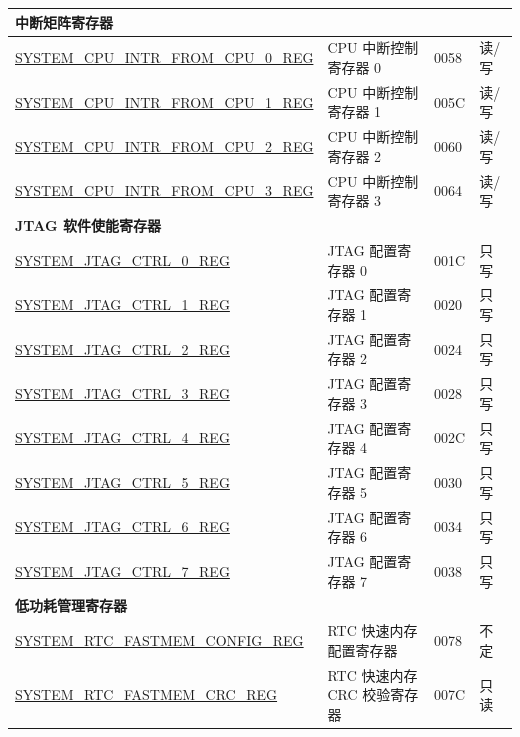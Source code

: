 \begin{longtable}{ | p{7cm} | p{6.5cm} | p{1.3cm} | p{1.5cm} | }
\multicolumn{4}{|l|}{\textbf{中断矩阵寄存器}} \\ \hline

\hyperref[regdesc:SYSTEMCPUINTRFROMCPU0REG]{SYSTEM\_CPU\_INTR\_FROM\_CPU\_0\_REG} & CPU 中断控制寄存器 0 & \hexprefix{}0058 & 读/写 \\ \hline
\hyperref[regdesc:SYSTEMCPUINTRFROMCPU1REG]{SYSTEM\_CPU\_INTR\_FROM\_CPU\_1\_REG} & CPU 中断控制寄存器 1 & \hexprefix{}005C & 读/写 \\ \hline
\hyperref[regdesc:SYSTEMCPUINTRFROMCPU2REG]{SYSTEM\_CPU\_INTR\_FROM\_CPU\_2\_REG} & CPU 中断控制寄存器 2 & \hexprefix{}0060 & 读/写 \\ \hline
\hyperref[regdesc:SYSTEMCPUINTRFROMCPU3REG]{SYSTEM\_CPU\_INTR\_FROM\_CPU\_3\_REG} & CPU 中断控制寄存器 3 & \hexprefix{}0064 & 读/写 \\ \hline

\multicolumn{4}{|l|}{\textbf{JTAG 软件使能寄存器}} \\ \hline

\hyperref[regdesc:SYSTEMJTAGCTRL0REG]{SYSTEM\_JTAG\_CTRL\_0\_REG} & JTAG 配置寄存器 0 & \hexprefix{}001C & 只写 \\ \hline
\hyperref[regdesc:SYSTEMJTAGCTRL1REG]{SYSTEM\_JTAG\_CTRL\_1\_REG} & JTAG 配置寄存器 1 & \hexprefix{}0020 & 只写 \\ \hline
\hyperref[regdesc:SYSTEMJTAGCTRL2REG]{SYSTEM\_JTAG\_CTRL\_2\_REG} & JTAG 配置寄存器 2 & \hexprefix{}0024 & 只写 \\ \hline
\hyperref[regdesc:SYSTEMJTAGCTRL3REG]{SYSTEM\_JTAG\_CTRL\_3\_REG} & JTAG 配置寄存器 3 & \hexprefix{}0028 & 只写 \\ \hline
\hyperref[regdesc:SYSTEMJTAGCTRL4REG]{SYSTEM\_JTAG\_CTRL\_4\_REG} & JTAG 配置寄存器 4 & \hexprefix{}002C & 只写 \\ \hline
\hyperref[regdesc:SYSTEMJTAGCTRL5REG]{SYSTEM\_JTAG\_CTRL\_5\_REG} & JTAG 配置寄存器 5 & \hexprefix{}0030 & 只写 \\ \hline
\hyperref[regdesc:SYSTEMJTAGCTRL6REG]{SYSTEM\_JTAG\_CTRL\_6\_REG} & JTAG 配置寄存器 6 & \hexprefix{}0034 & 只写 \\ \hline
\hyperref[regdesc:SYSTEMJTAGCTRL7REG]{SYSTEM\_JTAG\_CTRL\_7\_REG} & JTAG 配置寄存器 7 & \hexprefix{}0038 & 只写 \\ \hline

\multicolumn{4}{|l|}{\textbf{低功耗管理寄存器}} \\ \hline

\hyperref[regdesc:SYSTEMRTCFASTMEMCONFIGREG]{SYSTEM\_RTC\_FASTMEM\_CONFIG\_REG} & RTC 快速内存配置寄存器 & \hexprefix{}0078 & 不定 \\ \hline
\hyperref[regdesc:SYSTEMRTCFASTMEMCRCREG]{SYSTEM\_RTC\_FASTMEM\_CRC\_REG} & RTC 快速内存 CRC 校验寄存器 & \hexprefix{}007C & 只读\\ \hline


\end{longtable}
